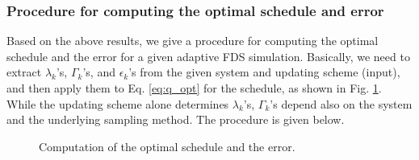 \documentclass[reprint, superscriptaddress, floatfix]{revtex4-1}
\begin{document}
\subsubsection{\label{sec:procedure}
Procedure for computing the optimal schedule and error
}


Based on the above results,
we give a procedure for computing
the optimal schedule and the error
for a given adaptive FDS simulation.
%
Basically, we need to extract
$\lambda_k$'s, $\Gamma_k$'s, and $\epsilon_k$'s
from the given system and updating scheme (input),
and then apply them to Eq. \eqref{eq:q_opt}
for the schedule,
as shown in Fig. \ref{fig:vardep}.
%
While the updating scheme alone
determines $\lambda_k$'s,
$\Gamma_k$'s depend also on the system
and the underlying sampling method.
%
The procedure is given below.

\begin{figure}[h]\centering
  \caption{
    \label{fig:vardep}
    Computation of the optimal schedule and the error.
  }
\end{figure}
\end{document}
